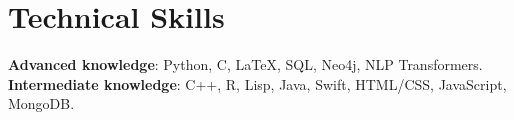 \documentclass[letterpaper,11pt]{article}
\begin{document}
%
\section{Technical Skills}
 \begin{itemize}[leftmargin=0.15in, label={}]
    \small{\item{
     \textbf{Advanced knowledge}{: Python, C, \LaTeX, SQL, Neo4j, NLP Transformers.} \\
     \textbf{Intermediate knowledge}{: C++, R, Lisp, Java, Swift, HTML/CSS, JavaScript, MongoDB.}
    }}
 \end{itemize}


\end{document}
